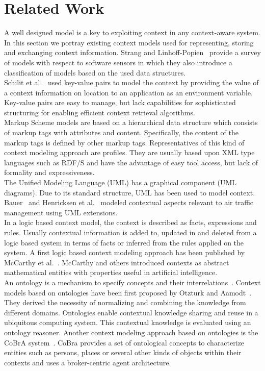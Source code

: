 \documentclass[copyright,creativecommons,noderivs,noncommercial]{eptcs}
\begin{document}
\section{Related Work}
A well designed model is a key to exploiting context in any context-aware system. In this section we portray existing context models used for representing, storing and exchanging context information. Strang and Linhoff-Popien~\cite{k24} provide a survey of models with respect to software sensors in which they also introduce a classification of models based on the used data structures.\\
Schilit et al.~\cite{k23} used key-value pairs to model the context by providing the value of a context information on location to an application as an environment variable. Key-value pairs are easy to manage, but lack capabilities for sophisticated structuring for enabling efficient context retrieval algorithms.\\
Markup Scheme models are based on a hierarchical data structure which consists of markup tags with attributes and content. Specifically, the content of the markup tags is defined by other markup tags. Representatives of this kind of context modeling approach are profiles. They are usually based upon XML type languages such as RDF/S and have the advantage of easy tool access, but lack of formality and expressiveness.\\
The Unified Modeling Language (UML) has a graphical component (UML diagrams). Due to its  standard structure, UML has been used to model context. Bauer~\cite{k4} and Henricksen et al.~\cite{k14,k15} modeled contextual aspects relevant to air traffic management using UML extensions.\\
In a logic based context model, the context is described as facts, expressions and rules. Usually contextual information is added to, updated in and deleted from a logic based system in terms of facts or inferred from the rules applied on the system. A first logic based context modeling approach has been published by McCarthy et al.~\cite{k20}. McCarthy and others introduced contexts as abstract mathematical entities with properties useful in artificial intelligence.\\
An ontology is a mechanism to specify concepts and their interrelations~\cite{k11}. Context models based on ontologies have been first proposed by Otzturk and Aamodt~\cite{k21}. They derived the necessity of normalizing and combining the knowledge from different domains. Ontologies enable contextual knowledge sharing and reuse in a ubiquitous computing system. This contextual knowledge is evaluated using an ontology reasoner. Another context modeling approach based on ontologies is the CoBrA system~\cite{k8}. CoBra provides a set of ontological concepts to characterize entities such as persons, places or several other kinds of objects within their contexts and uses a broker-centric agent architecture.\\
\end{document}
